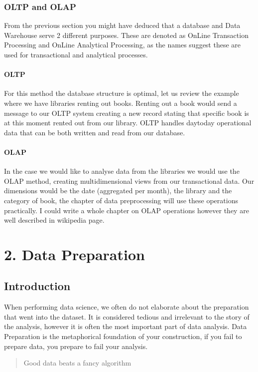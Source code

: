 \documentclass[letterpaper,10pt,english]{jupyterBook}
\begin{document}
\section{OLTP and OLAP}
\label{\detokenize{c1_introduction/introduction:oltp-and-olap}}
\sphinxAtStartPar
From the previous section you might have deduced that a database and Data Warehouse serve 2 different purposes.
These are denoted as OnLine Transaction Processing and OnLine Analytical Processing, as the names suggest these are used for transactional and analytical processes.


\subsection{OLTP}
\label{\detokenize{c1_introduction/introduction:oltp}}
\sphinxAtStartPar
For this method the database structure is optimal, let us review the example where we have libraries renting out books.
Renting out a book would send a message to our OLTP system creating a new record stating that specific book is at this moment rented out from our library.
OLTP handles day\sphinxhyphen{}to\sphinxhyphen{}day operational data that can be both written and read from our database.


\subsection{OLAP}
\label{\detokenize{c1_introduction/introduction:olap}}
\sphinxAtStartPar
In the case we would like to analyse data from the libraries we would use the OLAP method, creating multi\sphinxhyphen{}dimensional views from our transactional data.
Our dimensions would be the date (aggregated per month), the library and the category of book, the chapter of data preprocessing will use these operations practically.
I could write a whole chapter on OLAP operations however they are well described in  wikipedia page.


\part{2. Data Preparation}


\chapter{Introduction}
\label{\detokenize{c2_data_preparation/introduction:introduction}}\label{\detokenize{c2_data_preparation/introduction::doc}}
\sphinxAtStartPar
When performing data science, we often do not elaborate about the preparation that went into the dataset.
It is considered tedious and irrelevant to the story of the analysis,
however it is often the most important part of data analysis.
Data Preparation is the metaphorical foundation of your construction, if you fail to prepare data, you prepare to fail your analysis.
\begin{quote}

\sphinxAtStartPar
Good data beats a fancy algorithm
\end{quote}
\end{document}
